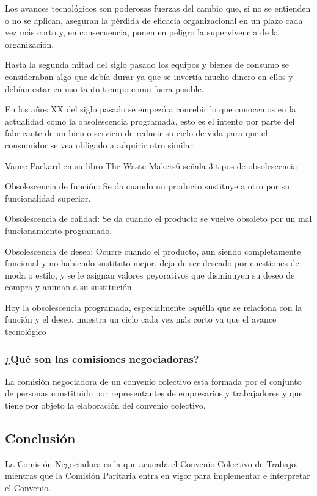 \documentclass[a4paper, 12pt]{article}
\begin{document}
Los avances tecnológicos son poderosas fuerzas del cambio que, si no se entienden o no se aplican, aseguran la pérdida de eficacia organizacional en un plazo cada vez más corto y, en consecuencia, ponen en peligro la supervivencia de la organización.

Hasta la segunda mitad del siglo pasado los equipos y bienes de consumo se consideraban algo que debía durar ya que se invertía mucho dinero en ellos y debían estar en uso tanto tiempo como fuera posible.

En los años XX del siglo pasado se empezó a concebir lo que conocemos en la actualidad como la obsolescencia programada, esto es el intento por parte del fabricante de un bien o servicio de reducir su ciclo de vida para que el consumidor se vea obligado a adquirir otro similar

Vance Packard en su libro The Waste Makers6 señala 3 tipos de obsolescencia

Obsolescencia de función: Se da cuando un producto sustituye a otro por su funcionalidad superior.

Obsolescencia de calidad: Se da cuando el producto se vuelve obsoleto por un mal funcionamiento programado.

Obsolescencia de deseo: Ocurre cuando el producto, aun siendo completamente funcional y no habiendo sustituto mejor, deja de ser deseado por cuestiones de moda o estilo, y se le asignan valores peyorativos que disminuyen su deseo de compra y animan a su sustitución.

Hoy la obsolescencia programada, especialmente aquélla que se relaciona con la función y el deseo, muestra un ciclo cada vez más corto ya que el avance tecnológico


\subsubsection{¿Qué son las comisiones negociadoras?}
La comisión negociadora de un convenio colectivo esta formada por el conjunto de personas constituido por representantes de empresarios y trabajadores y que tiene por objeto la elaboración del convenio colectivo.


\subsection{Conclusión}
La Comisión Negociadora es la que acuerda el Convenio Colectivo de Trabajo, mientras que la Comisión Paritaria entra en vigor para implementar e interpretar el Convenio.
\end{document}

